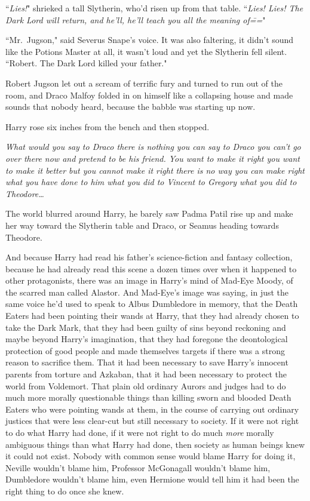 ``\emph{Lies!}" shrieked a tall Slytherin, who'd risen up from that table. ``\emph{Lies! Lies! The Dark Lord will return, and he'll, he'll teach you all the meaning of\===}"

``Mr.~Jugson," said Severus Snape's voice. It was also faltering, it didn't sound like the Potions Master at all, it wasn't loud and yet the Slytherin fell silent. ``Robert. The Dark Lord killed your father."

Robert Jugson let out a scream of terrific fury and turned to run out of the room, and Draco Malfoy folded in on himself like a collapsing house and made sounds that nobody heard, because the babble was starting up now.

Harry rose six inches from the bench and then stopped.

\emph{What would you say to Draco there is nothing you can say to Draco you can't go over there now and pretend to be his friend. You want to make it right you want to make it better but you cannot make it right there is no way you can make right what you have done to him what you did to Vincent to Gregory what you did to Theodore{\ldots}}

The world blurred around Harry, he barely saw Padma Patil rise up and make her way toward the Slytherin table and Draco, or Seamus heading towards Theodore.

And because Harry had read his father's science-fiction and fantasy collection, because he had already read this scene a dozen times over when it happened to other protagonists, there was an image in Harry's mind of Mad-Eye Moody, of the scarred man called Alastor. And Mad-Eye's image was saying, in just the same voice he'd used to speak to Albus Dumbledore in memory, that the Death Eaters had been pointing their wands at Harry, that they had already chosen to take the Dark Mark, that they had been guilty of sins beyond reckoning and maybe beyond Harry's imagination, that they had foregone the deontological protection of good people and made themselves targets if there was a strong reason to sacrifice them. That it had been necessary to save Harry's innocent parents from torture and Azkaban, that it had been necessary to protect the world from Voldemort. That plain old ordinary Aurors and judges had to do much more morally questionable things than killing sworn and blooded Death Eaters who were pointing wands at them, in the course of carrying out ordinary justices that were less clear-cut but still necessary to society. If it were not right to do what Harry had done, if it were not right to do much \emph{more} morally ambiguous things than what Harry had done, then society as human beings knew it could not exist. Nobody with common sense would blame Harry for doing it, Neville wouldn't blame him, Professor McGonagall wouldn't blame him, Dumbledore wouldn't blame him, even Hermione would tell him it had been the right thing to do once she knew.

